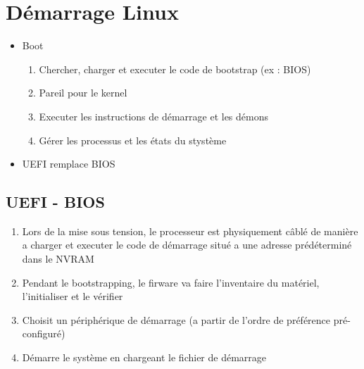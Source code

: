 \documentclass[a4paper]{article}
\begin{document}
      \section{Démarrage Linux}
      \begin{itemize}[label = \textbullet, font = \Large]
        \item Boot
        \begin{enumerate}[label=\ding{228}, font=\scriptsize] 
          \item Chercher, charger et executer le code de bootstrap (ex : BIOS)
          \item Pareil pour le kernel
          \item Executer les instructions de démarrage et les démons
          \item Gérer les processus et les états du stystème
        \end{enumerate}
        \item UEFI remplace BIOS
      \end{itemize}

      \subsection{UEFI - BIOS}
      \begin{enumerate}[label = \textbullet, font = \Large]
        \item Lors de la mise sous tension, le processeur est physiquement câblé de manière a charger et executer le code de démarrage situé a une adresse prédéterminé dans le NVRAM
        \item Pendant le bootstrapping, le firware va faire l'inventaire du matériel, l'initialiser et le vérifier
        \item Choisit un périphérique de démarrage (a partir de l'ordre de préférence pré-configuré)
        \item Démarre le système en chargeant le fichier de démarrage
      \end{enumerate}
\end{document}
